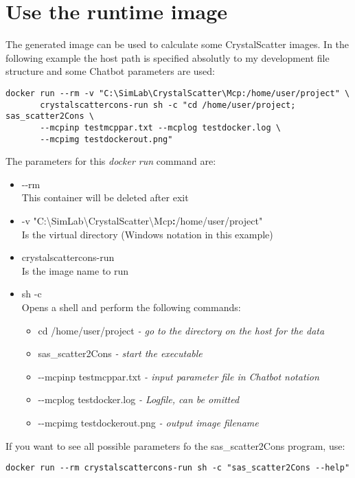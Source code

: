 \documentclass[11pt]{article} %
\begin{document}
\section{Use the runtime image} %

The generated image can be used to calculate some CrystalScatter images. In the following example the host path is specified absolutly to my development file structure and some Chatbot parameters are used:
\begin{lstlisting}[frame=single]
docker run --rm -v "C:\SimLab\CrystalScatter\Mcp:/home/user/project" \
       crystalscattercons-run sh -c "cd /home/user/project; sas_scatter2Cons \
       --mcpinp testmcppar.txt --mcplog testdocker.log \
       --mcpimg testdockerout.png"
\end{lstlisting}
The parameters for this {\it docker run} command are:
\begin{itemize}\itemsep0pt
\item -{}-rm \\
	This container will be deleted after exit
\item -v "C:{\textbackslash}SimLab{\textbackslash}CrystalScatter{\textbackslash}Mcp{\bf :}/home/user/project" \\
	Is the virtual directory (Windows notation in this example)
\item crystalscattercons-run \\
	Is the image name to run
\item sh -c \\
	Opens a shell and perform the following commands:
	\begin{itemize}[*]\itemsep0pt
	\item cd /home/user/project {\it - go to the directory on the host for the data}
	\item sas\_scatter2Cons {\it - start the executable}
	\item -{}-mcpinp testmcppar.txt {\it - input parameter file in Chatbot notation}
	\item -{}-mcplog testdocker.log {\it - Logfile, can be omitted}
	\item -{}-mcpimg testdockerout.png {\it - output image filename}
	\end{itemize}
\end{itemize}

If you want to see all possible parameters fo the sas\_scatter2Cons program, use: %
\begin{lstlisting}[frame=single]
docker run --rm crystalscattercons-run sh -c "sas_scatter2Cons --help"
\end{lstlisting}
\end{document}
